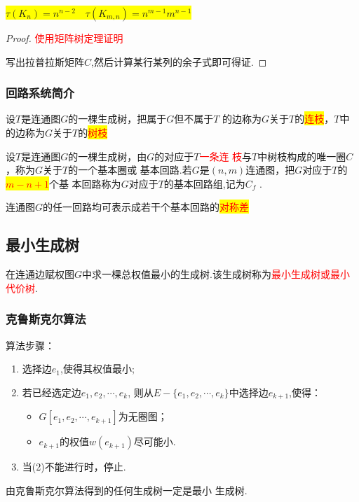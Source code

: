 \begin{theorem}
	\colorbox{yellow}{$\tau(K_n) = n^{n-2}\quad \tau(K_{m,n})=n^{m-1}m^{n-1}$}
\end{theorem}

\begin{proof}
	\textcolor{red}{使用矩阵树定理证明}
	
	写出拉普拉斯矩阵$C$,然后计算某行某列的余子式即可得证.
\end{proof}

\subsubsection{回路系统简介}

\begin{definition}
	设$T$是连通图$G$的一棵生成树，把属于$G$但不属于$T$
	的边称为$G$关于$T$的\colorbox{yellow}{\textcolor{red}{连枝}}，$T$中的边称为$G$关于$T$的\colorbox{yellow}{\textcolor{red}{树枝}}
\end{definition}

\begin{definition}
	设$T$是连通图$G$的一棵生成树，由$G$的对应于$T$\textcolor{red}{一条连
		枝}与$T$中树枝构成的唯一圈$C$，称为$G$关于$T$的一个基本圈或
	基本回路.若$G$是$(n, m)$连通图，把$G$对应于$T$的\colorbox{yellow}{\textcolor{red}{$m-n+1$}}个基
	本回路称为$G$对应于$T$的基本回路组,记为$C_f$ .
\end{definition}

\begin{theorem}
	连通图$G$的任一回路均可表示成若干个基本回路的\colorbox{yellow}{\textcolor{red}{对称差}}
\end{theorem}

\subsection{最小生成树}
\begin{definition}
	在连通边赋权图$G$中求一棵总权值最小的生成树.该生成树称为\textcolor{red}{最小生成树或最小代价树}.
\end{definition}

\subsubsection{克鲁斯克尔算法}
\noindent 算法步骤：
\begin{enumerate}
	\item 选择边$e_1$,使得其权值最小;
	\item 若已经选定边$e_1, e_2,\cdots, e_k$, 则从$E-\{e_1, e_2,\cdots, e_k\}$中选择边$e_{k+1}$,使得：
	\begin{itemize}
		\item $G[e_1, e_2,\cdots, e_{k+1}]$为无圈图；
		\item $e_{k+1}$的权值$w(e_{k+1})$尽可能小.
	\end{itemize}
	\item 当(2)不能进行时，停止.
	
\end{enumerate}
\begin{note}
	由克鲁斯克尔算法得到的任何生成树一定是最小
	生成树.
\end{note}

